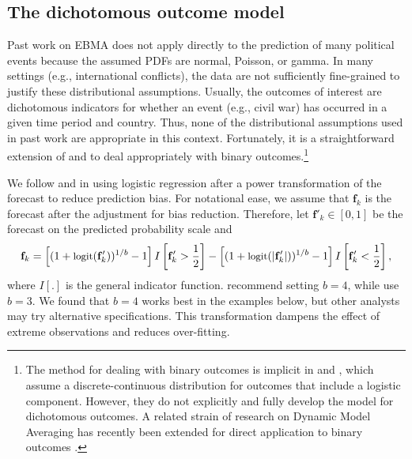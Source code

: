 \documentclass[12pt,fullpage]{article}
\newcommand{\note}[1]{\footnote{\doublespacing#1 \vspace{4 mm}}}
\begin{document}
\subsection{The dichotomous outcome model}

Past work on EBMA does not apply directly to the prediction of many
political events because the assumed PDFs are normal, Poisson, or
gamma. In many settings (e.g., international conflicts), the data are
not sufficiently fine-grained to justify these distributional
assumptions.  Usually, the outcomes of interest are dichotomous
indicators for whether an event (e.g., civil war) has occurred in a
given time period and country. Thus, none of the distributional
assumptions used in past work are appropriate in this context.
Fortunately, it is a straightforward extension of
\citet{Sloughter:2007} and \citet{Sloughter:2010} to deal
appropriately with binary outcomes.\note{The method for dealing with
  binary outcomes is implicit in \citet{Sloughter:2007} and
  \citet{Sloughter:2010}, which assume a discrete-continuous
  distribution for outcomes that include a logistic component.
  However, they do not explicitly and fully develop the model for
  dichotomous outcomes.  A related strain of research on Dynamic Model
  Averaging \citep[c.f.,][]{Raftery:2010, Muhlbaier:2007} has recently
  been extended for direct application to binary outcomes
  \citep[e.g.,][]{Mccormick:2011, Tomas:2011}.}

We follow \citet{Sloughter:2007} and \citet{Hamill:2004} in using
logistic regression after a power transformation of the forecast to
reduce prediction bias. For notational ease, we assume that $\mathbf{f}_k$ is the
forecast after the adjustment for bias reduction.  Therefore, let
$\mathbf{f}'_k \in [0,1]$ be the forecast on the predicted probability scale
 and
\begin{equation}
\small
\mathbf{f}_k =  \left[(1+\mbox{logit}(\mathbf{f}'_k))^{1/b} - 1\right]I\left[\mathbf{f}'_k>\frac{1}{2}\right]  - \left[(1+\mbox{logit}(|\mathbf{f}'_k|))^{1/b} -  1\right]I\left[\mathbf{f}'_k<\frac{1}{2}\right],
 \end{equation}
 \noindent where $I[.]$ is the general indicator function.
 \citet{Hamill:2004} recommend setting $b=4$, while
 \citet{Sloughter:2007} use $b=3$.  We found that $b=4$ works best in
 the examples below, but other analysts may try alternative
 specifications. This transformation dampens the effect of
   extreme observations and reduces over-fitting.
\end{document}

